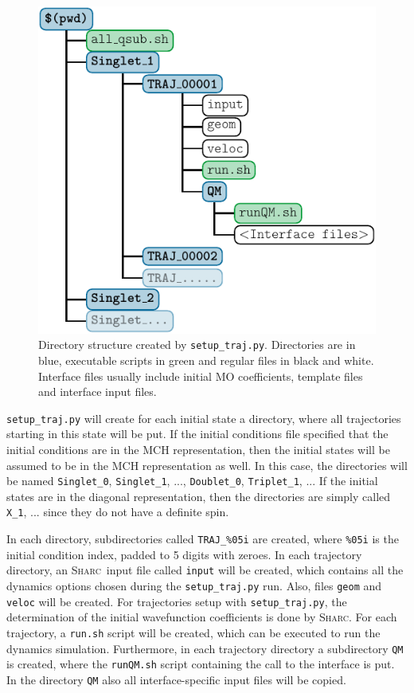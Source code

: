 \documentclass[a4paper,11pt,DIV=15,openany,twoside=false]{scrbook}
\newcommand{\sharc}{\textsc{Sharc}}
\newcommand{\ttt}[1]{\texttt{#1}}
\begin{document}
\begin{figure}
  \centering
  \includegraphics[scale=1]{img/dirs_traj/dirs_traj.pdf}
  \caption{Directory structure created by \ttt{setup\_traj.py}. Directories are in blue, executable scripts in green and regular files in black and white. Interface files usually include initial MO coefficients, template files and interface input files.}
  \label{fig:dirs_traj}
\end{figure}

\ttt{setup\_traj.py} will create for each initial state a directory, where all trajectories starting in this state will be put. If the initial conditions file specified that the initial conditions are in the MCH representation, then the initial states will be assumed to be in the MCH representation as well. In this case, the directories will be named \ttt{Singlet\_0}, \ttt{Singlet\_1}, ..., \ttt{Doublet\_0}, \ttt{Triplet\_1}, ... If the initial states are in the diagonal representation, then the directories are simply called \ttt{X\_1}, ... since they do not have a definite spin.

In each directory, subdirectories called \ttt{TRAJ\_\%05i} are created, where \ttt{\%05i} is the initial condition index, padded to 5 digits with zeroes. In each trajectory directory, an \sharc\ input file called \ttt{input} will be created, which contains all the dynamics options chosen during the \ttt{setup\_traj.py} run. Also, files \ttt{geom} and \ttt{veloc} will be created. For trajectories setup with \ttt{setup\_traj.py}, the determination of the initial wavefunction coefficients is done by \sharc.
For each trajectory, a \ttt{run.sh} script will be created, which can be executed to run the dynamics simulation. 
Furthermore, in each trajectory directory a subdirectory \ttt{QM} is created, where the \ttt{runQM.sh} script containing the call to the interface is put. In the directory \ttt{QM} also all interface-specific input files will be copied.
\end{document}
